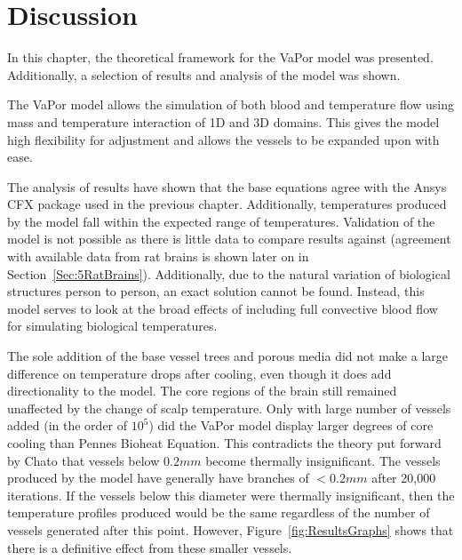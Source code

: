 \documentclass[11pt,english,a4paper,twoside,openright]{report}
\begin{document}
{{{{{{{{\section[Discussion]{{\Large D}iscussion}
\label{Sec:3Discussion}

In this chapter, the theoretical framework for the VaPor model was presented. Additionally, a selection of results and analysis of the model was shown.

The VaPor model allows the simulation of both blood and temperature flow using mass and temperature interaction of 1D and 3D domains. This gives the model high flexibility for adjustment and allows the vessels to be expanded upon with ease.

The analysis of results have shown that the base equations agree with the Ansys CFX package used in the previous chapter. Additionally, temperatures produced by the model fall within the expected range of temperatures. Validation of the model is not possible as there is little data to compare results against (agreement with available data from rat brains \cite{zhu2006body} is shown later on in Section~\ref{Sec:5RatBrains}). Additionally, due to the natural variation of biological structures person to person, an exact solution cannot be found. Instead, this model serves to look at the broad effects of including full convective blood flow for simulating biological temperatures.

The sole addition of the base vessel trees and porous media did not make a large difference on temperature drops after cooling, even though it does add directionality to the model. The core regions of the brain still remained unaffected by the change of scalp temperature. Only with large number of vessels added (in the order of $10^{5}$) did the VaPor model display larger degrees of core cooling than Pennes Bioheat Equation. This contradicts the theory put forward by Chato \cite{chato1980heat} that vessels below $0.2mm$ become thermally insignificant. The vessels produced by the model have generally have branches of {$<$}$0.2mm$ after 20,000 iterations. If the vessels below this diameter were thermally insignificant, then the temperature profiles produced would be the same regardless of the number of vessels generated after this point. However, Figure~\ref{fig:ResultsGraphs} shows that there is a definitive effect from these smaller vessels. 

}}}}}}}}
\end{document}
